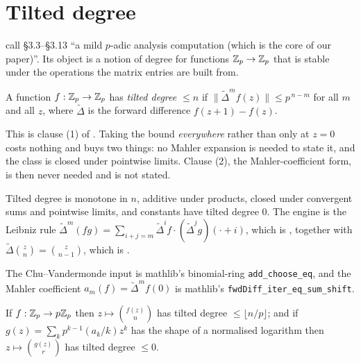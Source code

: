 \section{Tilted degree}

\cite{LWX} call \S3.3--\S3.13 ``a mild $p$-adic analysis computation (which is the core of our
paper)''.  Its object is a notion of degree for functions $\mathbb{Z}_p\to\mathbb{Z}_p$ that is stable under the
operations the matrix entries are built from.

\begin{definition}
  \label{def:tilteddeg}
  \leanok
  A function $f : \mathbb{Z}_p\to\mathbb{Z}_p$ has \emph{tilted degree $\leq n$} if
  $\lVert \tilde\Delta^{m}f(z)\rVert \leq p^{\,n-m}$ for all $m$ and all $z$, where
  $\tilde\Delta$ is the forward difference $f(z+1)-f(z)$.
\end{definition}

This is clause (1) of \cite[Definition-Proposition 3.8]{LWX}.  Taking the bound
\emph{everywhere} rather than only at $z=0$ costs nothing and buys two things: no Mahler
expansion is needed to state it, and the class is closed under pointwise limits.  Clause (2),
the Mahler-coefficient form, is then never needed and is not stated.

\begin{lemma}
  \label{lem:tilted-calculus}
  \leanok
  Tilted degree is monotone in $n$, additive under products, closed under convergent sums and
  pointwise limits, and constants have tilted degree $0$.  The engine is the Leibniz rule
  $\tilde\Delta^{m}(fg) = \sum_{i+j=m}\tilde\Delta^{i}f \cdot (\tilde\Delta^{j}g)(\cdot + i)$,
  which is \cite[(3.5.1)]{LWX}, together with
  $\tilde\Delta\binom{z}{n} = \binom{z}{n-1}$, which is \cite[(3.5.2)]{LWX}.
\end{lemma}

The Chu--Vandermonde input \cite[(3.5.3)]{LWX} is mathlib's binomial-ring
\texttt{add\_choose\_eq}, and the Mahler coefficient $a_m(f) = \tilde\Delta^{m}f(0)$ is mathlib's
\texttt{fwdDiff\_iter\_eq\_sum\_shift}.

\begin{lemma}
  \label{lem:tilted-binomial}
  \leanok
  If $f : \mathbb{Z}_p\to p\mathbb{Z}_p$ then $z\mapsto\binom{f(z)}{n}$ has tilted degree $\leq \lfloor n/p\rfloor$;
  and if $g(z) = \sum_k p^{k-1}(a_k/k)z^{k}$ has the shape of a normalised logarithm then
  $z\mapsto\binom{g(z)}{r}$ has tilted degree $\leq 0$.
\end{lemma}

